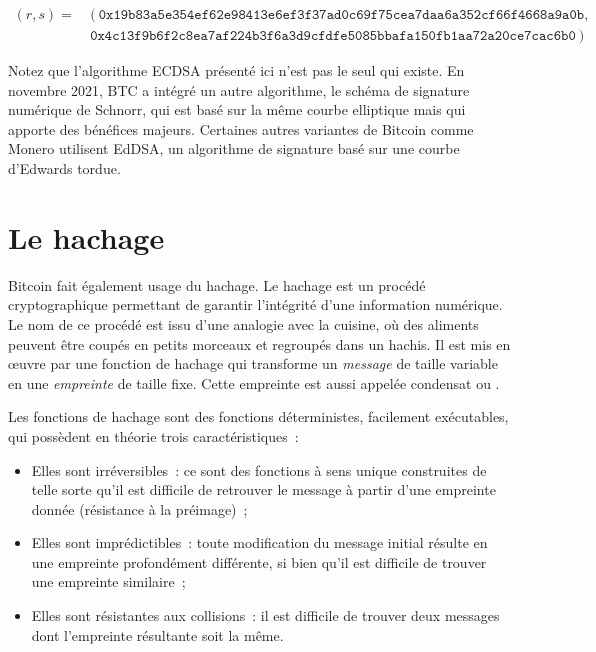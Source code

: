 { \scriptsize
\begin{align*}
(r, s) = &~(~\mathtt{0x19b83a5e354ef62e98413e6ef3f37ad0c69f75cea7daa6a352cf66f4668a9a0b}, \\
    &~\mathtt{0x4c13f9b6f2c8ea7af224b3f6a3d9cfdfe5085bbafa150fb1aa72a20ce7cac6b0}~)
\end{align*}
}

Notez que l'algorithme ECDSA présenté ici n'est pas le seul qui existe. En novembre 2021, BTC a intégré un autre algorithme, le schéma de signature numérique de Schnorr, qui est basé sur la même courbe elliptique mais qui apporte des bénéfices majeurs. Certaines autres variantes de Bitcoin comme Monero utilisent EdDSA, un algorithme de signature basé sur une courbe d'Edwards tordue.

\section*{Le hachage} %

Bitcoin fait également usage du hachage. Le hachage est un procédé cryptographique permettant de garantir l'intégrité d'une information numérique. Le nom de ce procédé est issu d'une analogie avec la cuisine, où des aliments peuvent être coupés en petits morceaux et regroupés dans un hachis. Il est mis en œuvre par une fonction de hachage qui transforme un \emph{message} de taille variable en une \emph{empreinte} de taille fixe. Cette empreinte est aussi appelée condensat ou .

Les fonctions de hachage sont des fonctions déterministes, facilement exécutables, qui possèdent en théorie trois caractéristiques~:

\begin{itemize}
  \item Elles sont irréversibles~: ce sont des fonctions à sens unique construites de telle sorte qu'il est difficile de retrouver le message à partir d'une empreinte donnée (résistance à la préimage)~;
  \item Elles sont imprédictibles~: toute modification du message initial résulte en une empreinte profondément différente, si bien qu'il est difficile de trouver une empreinte similaire~;
  \item Elles sont résistantes aux collisions~: il est difficile de trouver deux messages dont l'empreinte résultante soit la même.
\end{itemize}

